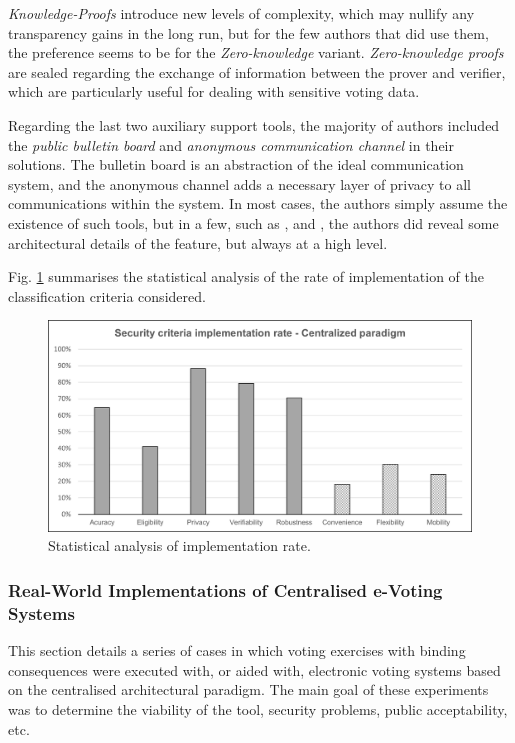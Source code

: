 \documentclass[../access.tex]{subfiles}
\begin{document}
    \par
    \textit{Knowledge-Proofs} introduce new levels of complexity, which may nullify any transparency gains in the long run, but for the few authors that did use them, the preference seems to be for the \textit{Zero-knowledge} variant. \textit{Zero-knowledge proofs} are sealed regarding the exchange of information between the prover and verifier, which are particularly useful for dealing with sensitive voting data.
    \par
    Regarding the last two auxiliary support tools, the majority of authors included the \textit{public bulletin board} and \textit{anonymous communication channel} in their solutions. The bulletin board is an abstraction of the ideal communication system, and the anonymous channel adds a necessary layer of privacy to all communications within the system. In most cases, the authors simply assume the existence of such tools, but in a few, such as \cite{Lee2000}, \cite{Cramer1996} and \cite{Cramer1997}, the authors did reveal some architectural details of the feature, but always at a high level.
    \par
    Fig. \ref{fig:implementation-rate-centralized} summarises the statistical analysis of the rate of implementation of the classification criteria considered.

    \begin{figure}[h!]
        \centering
        \includegraphics[width=\columnwidth]{Images/almei4.png}
        \caption{Statistical analysis of implementation rate.}
        \label{fig:implementation-rate-centralized}
    \end{figure}
    
    \subsubsection{Real-World Implementations of Centralised e-Voting Systems}
    \label{real-world-centralized}
    This section details a series of cases in which voting exercises with binding consequences were executed with, or aided with, electronic voting systems based on the centralised architectural paradigm. The main goal of these experiments was to determine the viability of the tool, security problems, public acceptability, etc.
    
\end{document}

